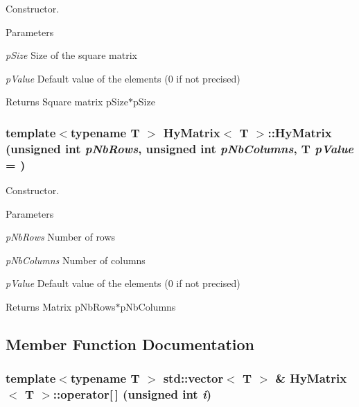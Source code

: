 Constructor. 


\begin{DoxyParams}{Parameters}
\item[{\em pSize}]Size of the square matrix \item[{\em pValue}]Default value of the elements (0 if not precised) \end{DoxyParams}
\begin{DoxyReturn}{Returns}
Square matrix pSize$\ast$pSize 
\end{DoxyReturn}
\hypertarget{classHyMatrix_a43816079e02155aedf11c1101bd35bc4}{
\subsubsection[{HyMatrix}]{\setlength{\rightskip}{0pt plus 5cm}template$<$typename T $>$ {\bf HyMatrix}$<$ T $>$::{\bf HyMatrix} (unsigned int {\em pNbRows}, \/  unsigned int {\em pNbColumns}, \/  T {\em pValue} = {})}}
\label{classHyMatrix_a43816079e02155aedf11c1101bd35bc4}


Constructor. 


\begin{DoxyParams}{Parameters}
\item[{\em pNbRows}]Number of rows \item[{\em pNbColumns}]Number of columns \item[{\em pValue}]Default value of the elements (0 if not precised) \end{DoxyParams}
\begin{DoxyReturn}{Returns}
Matrix pNbRows$\ast$pNbColumns 
\end{DoxyReturn}


\subsection{Member Function Documentation}
\hypertarget{classHyMatrix_ae6752e1b495cc71c41c68632afe0761c}{
\subsubsection[{operator[]}]{\setlength{\rightskip}{0pt plus 5cm}template$<$typename T $>$ std::vector$<$ T $>$ \& {\bf HyMatrix}$<$ T $>$::operator\mbox{[}$\,$\mbox{]} (unsigned int {\em i})}}
\label{classHyMatrix_ae6752e1b495cc71c41c68632afe0761c}



